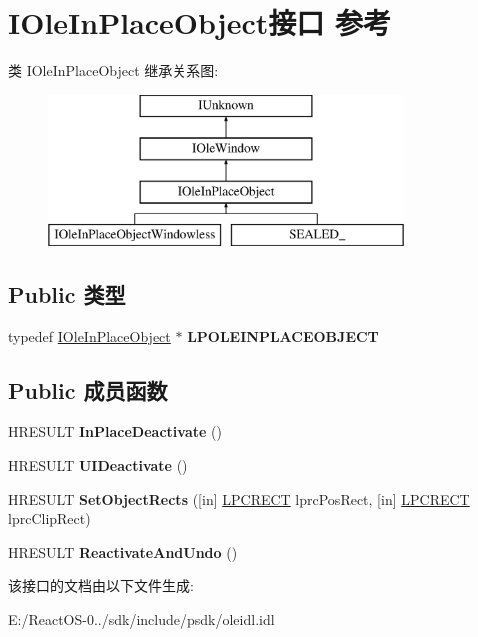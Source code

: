 \hypertarget{interface_i_ole_in_place_object}{}\section{I\+Ole\+In\+Place\+Object接口 参考}
\label{interface_i_ole_in_place_object}
类 I\+Ole\+In\+Place\+Object 继承关系图\+:\begin{figure}[H]
\begin{center}
\leavevmode
\includegraphics[height=4.000000cm]{interface_i_ole_in_place_object}
\end{center}
\end{figure}
\subsection*{Public 类型}
\begin{DoxyCompactItemize}
\item 
\mbox{\label{interface_i_ole_in_place_object_a665ba8f140cf1fbac96d9962760a253a}} 
typedef \hyperlink{interface_i_ole_in_place_object}{I\+Ole\+In\+Place\+Object} $\ast$ {\bfseries L\+P\+O\+L\+E\+I\+N\+P\+L\+A\+C\+E\+O\+B\+J\+E\+CT}
\end{DoxyCompactItemize}
\subsection*{Public 成员函数}
\begin{DoxyCompactItemize}
\item 
\mbox{\label{interface_i_ole_in_place_object_a1eb9a2c592274f7c1caa59be95b2ccca}} 
H\+R\+E\+S\+U\+LT {\bfseries In\+Place\+Deactivate} ()
\item 
\mbox{\label{interface_i_ole_in_place_object_a77c6d4fa5f63fb98db578f0271d4c0c6}} 
H\+R\+E\+S\+U\+LT {\bfseries U\+I\+Deactivate} ()
\item 
\mbox{\label{interface_i_ole_in_place_object_a60a087babc2f305fde365725cd240cc1}} 
H\+R\+E\+S\+U\+LT {\bfseries Set\+Object\+Rects} (\mbox{[}in\mbox{]} \hyperlink{structtag_r_e_c_t}{L\+P\+C\+R\+E\+CT} lprc\+Pos\+Rect, \mbox{[}in\mbox{]} \hyperlink{structtag_r_e_c_t}{L\+P\+C\+R\+E\+CT} lprc\+Clip\+Rect)
\item 
\mbox{\label{interface_i_ole_in_place_object_aef38c1422f6ca741c53dae9b909514e8}} 
H\+R\+E\+S\+U\+LT {\bfseries Reactivate\+And\+Undo} ()
\end{DoxyCompactItemize}


该接口的文档由以下文件生成\+:\begin{DoxyCompactItemize}
\item 
E\+:/\+React\+O\+S-\/0../sdk/include/psdk/oleidl.\+idl\end{DoxyCompactItemize}
